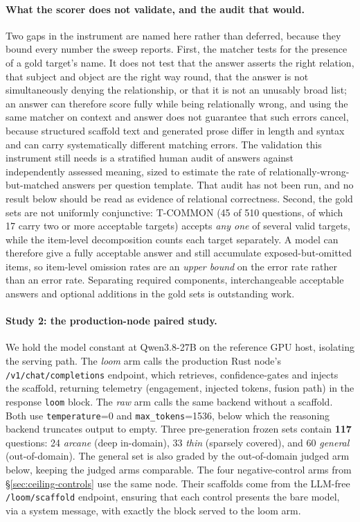 \documentclass[10pt,twocolumn]{article}
\begin{document}
\paragraph{What the scorer does not validate, and the audit that would.} Two gaps in the instrument are named here rather than deferred, because they bound every number the sweep reports. First, the matcher tests for the presence of a gold target's name. It does not test that the answer asserts the right relation, that subject and object are the right way round, that the answer is not simultaneously denying the relationship, or that it is not an unusably broad list; an answer can therefore score fully while being relationally wrong, and using the same matcher on context and answer does not guarantee that such errors cancel, because structured scaffold text and generated prose differ in length and syntax and can carry systematically different matching errors. The validation this instrument still needs is a stratified human audit of answers against independently assessed meaning, sized to estimate the rate of relationally-wrong-but-matched answers per question template. That audit has not been run, and no result below should be read as evidence of relational correctness. Second, the gold sets are not uniformly conjunctive: T-COMMON (45 of 510 questions, of which 17 carry two or more acceptable targets) accepts \emph{any one} of several valid targets, while the item-level decomposition counts each target separately. A model can therefore give a fully acceptable answer and still accumulate exposed-but-omitted items, so item-level omission rates are an \emph{upper bound} on the error rate rather than an error rate. Separating required components, interchangeable acceptable answers and optional additions in the gold sets is outstanding work.

\paragraph{Study 2: the production-node paired study.} We hold the model constant at Qwen3.8-27B on the reference GPU host, isolating the serving path. The \emph{loom} arm calls the production Rust node's \texttt{/v1/chat/completions} endpoint, which retrieves, confidence-gates and injects the scaffold, returning telemetry (engagement, injected tokens, fusion path) in the response \texttt{loom} block. The \emph{raw} arm calls the same backend without a scaffold. Both use \texttt{temperature}=0 and \texttt{max\_tokens}=1536, below which the reasoning backend truncates output to empty. Three pre-generation frozen sets contain \textbf{117} questions: 24 \emph{arcane} (deep in-domain), 33 \emph{thin} (sparsely covered), and 60 \emph{general} (out-of-domain). The general set is also graded by the out-of-domain judged arm below, keeping the judged arms comparable. The four negative-control arms from \S\ref{sec:ceiling-controls} use the same node. Their scaffolds come from the LLM-free \texttt{/loom/scaffold} endpoint, ensuring that each control presents the bare model, via a system message, with exactly the block served to the loom arm.
\end{document}
